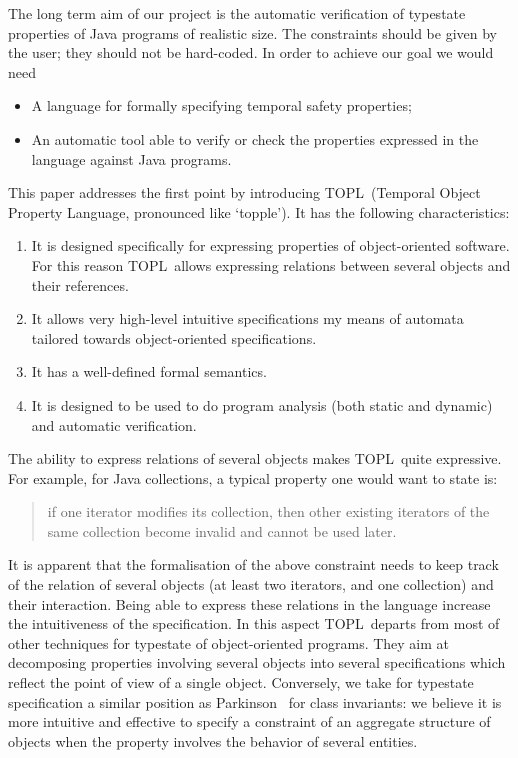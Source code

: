\documentclass[preprint]{sigplanconf} %
\newcommand{\TPL}{TOPL}
\newcommand{\note}[2]{\textcolor{gray}{[\textcolor{red}{#1}: #2]}}
\newcommand{\rg}[1]{\note{rg}{#1}}
\theoremstyle{definition}
\theoremstyle{remark}
\begin{document}
The long term aim of our project is the automatic verification of typestate properties of Java programs of realistic size.
The constraints should be given by the user; they should not be hard-coded.
In order to achieve our goal we would need
\begin{itemize}
\item A language for formally specifying temporal safety properties;
\item An automatic tool able to verify or check the properties expressed in the language against Java programs.
\end{itemize}
This paper addresses the first point by introducing \TPL  \ (Temporal Object Property Language, pronounced like `topple').
It has the following characteristics:
\begin{enumerate}
\item It is designed specifically for expressing properties of object-oriented software. For this reason \TPL \ allows expressing relations between several objects and their references.
\item It allows very high-level intuitive specifications my means of automata tailored towards object-oriented specifications.
\item  It has a well-defined formal semantics.
\item  It is designed to be used to do program analysis (both static and dynamic) and automatic verification.
\end{enumerate}
The ability to express relations of several objects makes  \TPL \ quite expressive. For example, for Java collections, a typical property one would want to state is:

\begin{quote}
if one iterator modifies its collection, then other existing iterators of the same collection become invalid and cannot be used later.
\end{quote}
\noindent 
It is apparent that the formalisation of the above constraint needs to keep track of the relation of several objects (at least two iterators, and one collection) and their interaction. Being able to express these relations in the language 
increase the intuitiveness of the specification.
In this aspect \TPL \ departs from most of other techniques for typestate of object-oriented programs. They aim at decomposing properties involving several objects into several specifications which reflect 
the point of view of a single object. Conversely,  we take for typestate specification a similar position as Parkinson~\cite{parkinson-iwaco2007} for class invariants: we believe it is more intuitive and effective to specify a constraint of 
an aggregate structure of objects when the property involves the behavior of  several entities.
   
\end{document}

